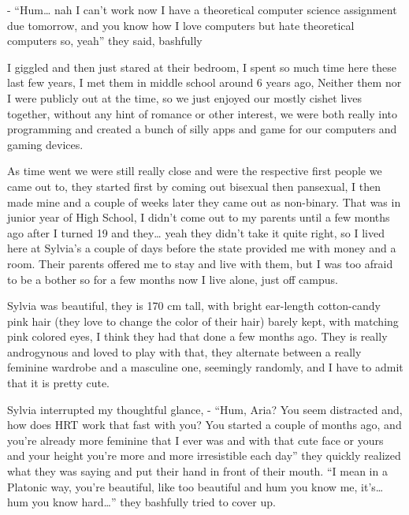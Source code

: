 \documentclass[colorlinks,12pt,a4paper]{book}
\begin{document}
- “Hum… nah I can't work now I have a theoretical computer science assignment due tomorrow,
and you know how I love computers but hate theoretical computers so, yeah” they said, bashfully\par
\bigskip

I giggled and then just stared at their bedroom, 
I spent so much time here these last few years, I met them in middle school around 6 years ago, 
Neither them nor I were publicly out at the time, so we just enjoyed our mostly cishet lives together,
 without any hint of romance or other interest, we were both really into programming and created a bunch of
silly apps and game for our computers and gaming devices.\par
\bigskip

As time went we were still really close and were the respective 
first people we came out to, they started first by coming out bisexual then pansexual, 
I then made mine and a couple of weeks later they came out as non-binary. That was in junior year of High School,
 I didn't come out to my parents until a few months ago after I turned 19 and they… yeah they didn't take it quite right, so
I lived here at Sylvia's a couple of days before the state provided me with money and a room. 
Their parents offered me to stay and live with them, but I was too afraid to be a bother so for a few months 
now I live alone, just off campus.\par 
\bigskip

Sylvia was beautiful, they is 170 cm tall, with bright ear-length cotton-candy pink hair 
(they love to change the color of their hair) barely kept, with matching pink colored eyes, 
I think they had that done a few months ago. They is really androgynous and loved to play with that, 
they alternate between a really feminine wardrobe and a masculine one, seemingly randomly, and 
I have to admit that it is pretty cute.\par
\bigskip

Sylvia interrupted my thoughtful glance,\newline
- “Hum, Aria? You seem distracted and, how does HRT work that fast with you? 
You started a couple of months ago, and you're already more feminine that I ever was and with that cute 
face or yours and your height you're more and more irresistible each day” they quickly realized what 
they was saying and put their hand in front of their mouth.\newline
“I mean in a Platonic way, you're beautiful, like too beautiful and hum you know me, it's… hum you know hard…” 
they bashfully tried to cover up.\par 
\bigskip
\end{document}
